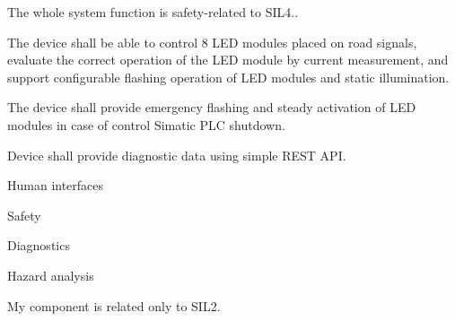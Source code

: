 The whole system function is safety-related to SIL4..

The device shall be able to control 8 LED modules placed on road signals, evaluate the correct operation of the LED module by current measurement, and support configurable flashing operation of LED modules and static illumination.

The device shall provide emergency flashing and steady activation of LED modules in case of control Simatic PLC shutdown.

Device shall provide diagnostic data using simple REST API.

\secc Human interfaces

\secc Safety

\secc Diagnostics

\sec Hazard analysis


My component is related only to SIL2.